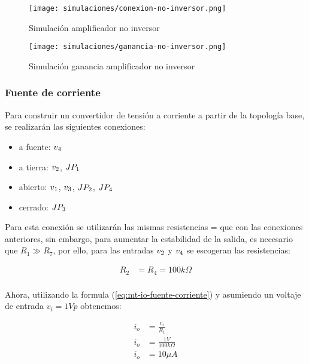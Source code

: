 \begin{figure}[ht]
    \centering
    \texttt{[image: simulaciones/conexion-no-inversor.png]}
    \caption{Simulación amplificador no inversor}
    \label{fig:sim-amp-no-inversor}
\end{figure}

\begin{figure}[ht]
    \centering
    \texttt{[image: simulaciones/ganancia-no-inversor.png]}
    \caption{Simulación ganancia amplificador no inversor}
    \label{fig:sim-amp-no-inversor-ganancia}
\end{figure}

\FloatBarrier
\subsubsection{Fuente de corriente}

Para construir un convertidor de tensión a corriente a partir de la topología base, se realizarán las siguientes conexiones:

\begin{itemize}
    \item a fuente: $\volt{4}$
    \item a tierra: $\volt{2}$, $\jumper{1}$
    \item abierto: $\volt{1}$, $\volt{3}$, $\jumper{2}$, $\jumper{4}$
    \item cerrado: $\jumper{3}$
\end{itemize}

Para esta conexión se utilizarán las mismas resistencias  =  que con las conexiones anteriores, sin embargo, para aumentar la estabilidad de la salida, es necesario que $R_1 \gg R_7$, por ello, para las entradas $\volt{2}$ y $\volt{4}$ se escogeran las resistencias:

\begin{align*}
    R_2 &= R_4 = 100k\Omega \\
\end{align*}

Ahora, utilizando la formula (\ref{eq:mt-io-fuente-corriente}) y asumiendo un voltaje de entrada $v_i = 1Vp$ obtenemos:

\begin{align*}
    i_o &= \frac{v_i}{R_1}  \\
    i_o &= \frac{1V}{100k\Omega}  \\
    i_o & = 10\mu A
\end{align*}

